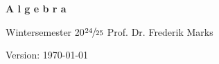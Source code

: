 	\begin{center}
		\vspace*{1cm}
		
		{\fontsize{40}{48} \textbf{A l g e b r a}}
		
		\vspace{0.5cm}
		
		Wintersemester 20$\sfrac{24}{25}$ \quad Prof. Dr. Frederik Marks
		
		\vspace{1.0cm}
		Version: \today
		
	\end{center}